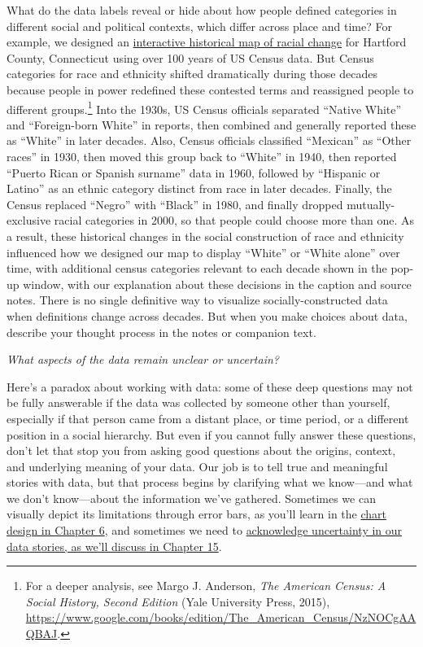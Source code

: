 \documentclass[
  english,
]{book}
\begin{document}
What do the data labels reveal or hide about how people defined categories in different social and political contexts, which differ across place and time? For example, we designed an \href{https://ontheline.github.io/otl-racial-change/index-caption.html}{interactive historical map of racial change} for Hartford County, Connecticut using over 100 years of US Census data. But Census categories for race and ethnicity shifted dramatically during those decades because people in power redefined these contested terms and reassigned people to different groups.\footnote{For a deeper analysis, see Margo J. Anderson, \emph{The {American Census}: {A Social History}, {Second Edition}} ({Yale University Press}, 2015), \url{https://www.google.com/books/edition/The_American_Census/NzNOCgAAQBAJ}.} Into the 1930s, US Census officials separated ``Native White'' and ``Foreign-born White'' in reports, then combined and generally reported these as ``White'' in later decades. Also, Census officials classified ``Mexican'' as ``Other races'' in 1930, then moved this group back to ``White'' in 1940, then reported ``Puerto Rican or Spanish surname'' data in 1960, followed by ``Hispanic or Latino'' as an ethnic category distinct from race in later decades. Finally, the Census replaced ``Negro'' with ``Black'' in 1980, and finally dropped mutually-exclusive racial categories in 2000, so that people could choose more than one. As a result, these historical changes in the social construction of race and ethnicity influenced how we designed our map to display ``White'' or ``White alone'' over time, with additional census categories relevant to each decade shown in the pop-up window, with our explanation about these decisions in the caption and source notes. There is no single definitive way to visualize socially-constructed data when definitions change across decades. But when you make choices about data, describe your thought process in the notes or companion text.

\emph{What aspects of the data remain unclear or uncertain?}

Here's a paradox about working with data: some of these deep questions may not be fully answerable if the data was collected by someone other than yourself, especially if that person came from a distant place, or time period, or a different position in a social hierarchy. But even if you cannot fully answer these questions, don't let that stop you from asking good questions about the origins, context, and underlying meaning of your data. Our job is to tell true and meaningful stories with data, but that process begins by clarifying what we know---and what we don't know---about the information we've gathered. Sometimes we can visually depict its limitations through error bars, as you'll learn in the \href{chart-design.html}{chart design in Chapter 6}, and sometimes we need to \href{sources-uncertainty.html}{acknowledge uncertainty in our data stories, as we'll discuss in Chapter 15}.
\end{document}
